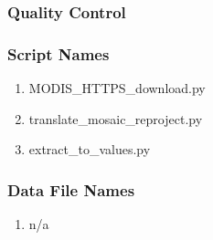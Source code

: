\subsubsection*{Quality Control}
\subsubsection*{Script Names}
\begin{enumerate}
\item MODIS\_HTTPS\_download.py
\item translate\_mosaic\_reproject.py
\item extract\_to\_values.py
\end{enumerate}
\subsubsection*{Data File Names}
\begin{enumerate}
\item n/a
\end{enumerate}
